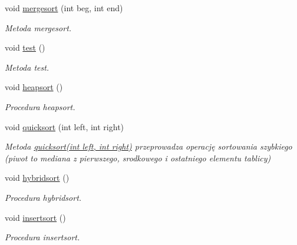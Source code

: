 \begin{DoxyCompactItemize}
void \hyperlink{class_lista__tab_a409e9a4edbef4337980c7184b6cbfb63}{mergesort} (int beg, int end)
\begin{DoxyCompactList}\small\item\em Metoda mergesort. \end{DoxyCompactList}\item 
void \hyperlink{class_lista__tab_a34c4a75347b05d367d7d1b08fcbde095}{test} ()
\begin{DoxyCompactList}\small\item\em Metoda test. \end{DoxyCompactList}\item 
void \hyperlink{class_lista__tab_ac9dc3e6ccaff0aef1a1370c1a83c48d9}{heapsort} ()
\begin{DoxyCompactList}\small\item\em Procedura heapsort. \end{DoxyCompactList}\item 
void \hyperlink{class_lista__tab_a1a20726180b67b7cf2a669cafd6d3ca3}{quicksort} (int left, int right)
\begin{DoxyCompactList}\small\item\em Metoda \hyperlink{class_lista__tab_a1a20726180b67b7cf2a669cafd6d3ca3}{quicksort(int left, int right)} przeprowadza operację sortowania szybkiego (piwot to mediana z pierwszego, srodkowego i ostatniego elementu tablicy) \end{DoxyCompactList}\item 
void \hyperlink{class_lista__tab_a9ae23cf825b116cb27ccc73bd4bca3c8}{hybridsort} ()
\begin{DoxyCompactList}\small\item\em Procedura hybridsort. \end{DoxyCompactList}\item 
void \hyperlink{class_lista__tab_afa5a23960858fae52090ef31e8529b2b}{insertsort} ()
\begin{DoxyCompactList}\small\item\em Procedura insertsort. \end{DoxyCompactList}\end{DoxyCompactItemize}
